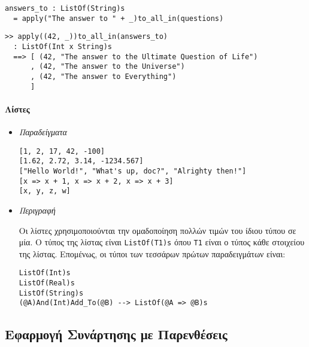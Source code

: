 \documentclass[diploma]{softlab-thesis}
\begin{document}
\begin{itemize}
\begin{verbatim}
answers_to : ListOf(String)s
  = apply("The answer to " + _)to_all_in(questions)
\end{verbatim}

\begin{verbatim}
>> apply((42, _))to_all_in(answers_to)
  : ListOf(Int x String)s
  ==> [ (42, "The answer to the Ultimate Question of Life")
      , (42, "The answer to the Universe")
      , (42, "The answer to Everything")
      ]
\end{verbatim}

\end{itemize}

\paragraph{Λίστες}

\begin{itemize}

\item \textit{Παραδείγματα}
\begin{verbatim}
[1, 2, 17, 42, -100]
[1.62, 2.72, 3.14, -1234.567]
["Hello World!", "What's up, doc?", "Alrighty then!"]
[x => x + 1, x => x + 2, x => x + 3]
[x, y, z, w]
\end{verbatim}

\item \textit{Περιγραφή}

Οι λίστες χρησιμοποιούνται την ομαδοποίηση πολλών τιμών του ίδιου τύπου σε μία.
Ο τύπος της λίστας είναι \verb|ListOf(T1)s| όπου \verb|T1| είναι ο τύπος κάθε
στοιχείου της λίστας.  Επομένως, οι τύποι των τεσσάρων πρώτων παραδειγμάτων
είναι:
\begin{verbatim}
ListOf(Int)s
ListOf(Real)s
ListOf(String)s
(@A)And(Int)Add_To(@B) --> ListOf(@A => @B)s
\end{verbatim}

\end{itemize}

\subsection{Εφαρμογή Συνάρτησης με Παρενθέσεις}
\label{subsubsec:parenfuncappgr}
\end{document}
